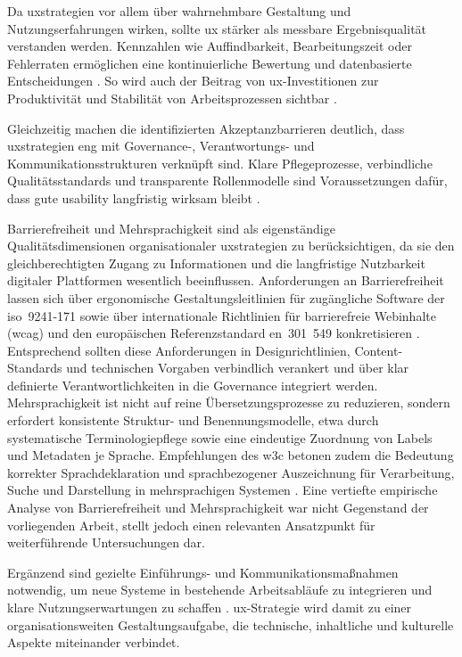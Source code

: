 Da \Gls{uxstrategien} vor allem über wahrnehmbare Gestaltung und Nutzungserfahrungen wirken, sollte \Gls{ux} stärker als messbare Ergebnisqualität verstanden werden. Kennzahlen wie Auffindbarkeit, Bearbeitungszeit oder Fehlerraten ermöglichen eine kontinuierliche Bewertung und datenbasierte Entscheidungen \cite{300:FraunhoferIESE2018,101:Khan2021}. So wird auch der Beitrag von \Gls{ux}-Investitionen zur Produktivität und Stabilität von Arbeitsprozessen sichtbar \cite{301:Infragistics2015,100:WhartonUX2015}.

Gleichzeitig machen die identifizierten Akzeptanzbarrieren deutlich, dass \Gls{uxstrategien} eng mit Governance-, Verantwortungs- und Kommunikationsstrukturen verknüpft sind. Klare Pflegeprozesse, verbindliche Qualitätsstandards und transparente Rollenmodelle sind Voraussetzungen dafür, dass gute \Gls{usability} langfristig wirksam bleibt \cite{115:NNGContentManagement,309:NNGContentGovernance,116:StepTwoGuidance}.

Barrierefreiheit und Mehrsprachigkeit sind als eigenständige Qualitätsdimensionen organisationaler \Gls{uxstrategien} zu berücksichtigen, da sie den gleichberechtigten Zugang zu Informationen und die langfristige Nutzbarkeit digitaler Plattformen wesentlich beeinflussen. Anforderungen an Barrierefreiheit lassen sich über ergonomische Gestaltungsleitlinien für zugängliche Software der \acrshort{iso}~9241-171 sowie über internationale Richtlinien für barrierefreie Webinhalte (\Gls{wcag}) und den europäischen Referenzstandard \acrshort{en}~301~549 konkretisieren \cite{502:ISO9241-171,503:WCAG22,504:EN301549}. Entsprechend sollten diese Anforderungen in Designrichtlinien, Content-Standards und technischen Vorgaben verbindlich verankert und über klar definierte Verantwortlichkeiten in die Governance integriert werden.
Mehrsprachigkeit ist nicht auf reine Übersetzungsprozesse zu reduzieren, sondern erfordert konsistente Struktur- und Benennungsmodelle, etwa durch systematische Terminologiepflege sowie eine eindeutige Zuordnung von Labels und Metadaten je Sprache. Empfehlungen des \Gls{w3c} betonen zudem die Bedeutung korrekter Sprachdeklaration und sprachbezogener Auszeichnung für Verarbeitung, Suche und Darstellung in mehrsprachigen Systemen \cite{505:W3Ci18nAuthoring,506:W3Ci18nQuickTips}. Eine vertiefte empirische Analyse von Barrierefreiheit und Mehrsprachigkeit war nicht Gegenstand der vorliegenden Arbeit, stellt jedoch einen relevanten Ansatzpunkt für weiterführende Untersuchungen dar.

Ergänzend sind gezielte Einführungs- und Kommunikationsmaßnahmen notwendig, um neue Systeme in bestehende Arbeitsabläufe zu integrieren und klare Nutzungserwartungen zu schaffen \cite{110:Lewin1947,418:Kotter2012,118:NNGUserInvolvement}. \Gls{ux}-Strategie wird damit zu einer organisationsweiten Gestaltungsaufgabe, die technische, inhaltliche und kulturelle Aspekte miteinander verbindet.

